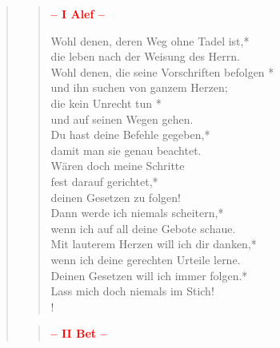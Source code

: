\thispagestyle{plain}


\begin{quote}
\begin{verse}
 
\begin{center}
 \textcolor{red}{\normalsize\bf – I Alef –}\\
\end{center} 

Wohl denen, deren Weg ohne Tadel ist,*\\
die leben nach der Weisung des Herrn.\\
\vin Wohl denen, die seine Vorschriften befolgen *\\
\vin und ihn suchen von ganzem Herzen;\\
die kein Unrecht tun *\\
und auf seinen Wegen gehen.\\
\vin Du hast deine Befehle gegeben,*\\
\vin damit man sie genau beachtet.\\
Wären doch meine Schritte\\
 fest darauf gerichtet,*\\
deinen Gesetzen zu folgen!\\
\vin Dann werde ich niemals scheitern,*\\
\vin wenn ich auf all deine Gebote schaue.\\
Mit lauterem Herzen will ich dir danken,*\\
wenn ich deine gerechten Urteile lerne.\\
\vin Deinen Gesetzen will ich immer folgen.*\\
\vin Lass mich doch niemals im Stich!\\!

\end{verse}

\begin{verse}

\begin{center}
 \textcolor{red}{\normalsize\bf – II Bet –}\\
\end{center}


\end{verse}
\end{quote}
